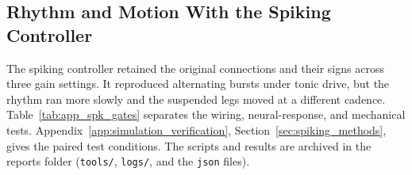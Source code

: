 \subsection{Rhythm and Motion With the Spiking Controller}

The spiking controller retained the original connections and their signs across three gain settings. It reproduced alternating bursts under tonic drive, but the rhythm ran more slowly and the suspended legs moved at a different cadence. Table~\ref{tab:app_spk_gates} separates the wiring, neural-response, and mechanical tests. Appendix~\ref{app:simulation_verification}, Section~\ref{sec:spiking_methods}, gives the paired test conditions. The scripts and results are archived in the reports folder (\nolinkurl{tools/}, \nolinkurl{logs/}, and the \texttt{json} files).

